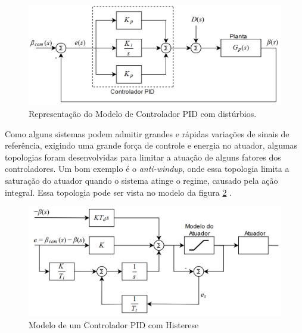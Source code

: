 \begin{figure}[H]
  \caption{Representação do Modelo de Controlador PID com distúrbios.}
  \begin{center}
      \includegraphics[scale=0.55]{img/pid_controller_Snider_p35}
  \end{center}
  \label{fig:pid_controller_Snider_p35}
\end{figure}

Como alguns sistemas podem admitir grandes e rápidas variações de sinais de referência, exigindo uma grande força de controle e energia no atuador, algumas topologias foram desenvolvidas para limitar a atuação de alguns fatores dos controladores. Um bom exemplo é o \textit{anti-windup}, onde essa topologia limita a saturação do atuador quando o sistema atinge o regime, causado pela ação integral. Essa topologia pode ser vista no modelo da figura \ref{fig:pid_antiwindup_astrom_p83} \cite{Astrom1995}.

\begin{figure}[H]
  \caption{Modelo de um Controlador PID com Histerese}
  \begin{center}
      \includegraphics[scale=0.55]{img/pid_antiwindup_astrom_p83}
  \end{center}
  \label{fig:pid_antiwindup_astrom_p83}
\end{figure}

